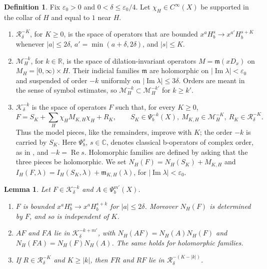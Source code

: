 \documentclass[11pt,oneside,reqno]{article}
\newcommand{\C}{\mathbb C}
\theoremstyle{plain}
\newtheorem{lemma}[theorem]{Lemma}
\theoremstyle{definition}
\newtheorem{definition}[theorem]{Definition}
\theoremstyle{remark}
\begin{document}
\begin{definition}\label{def:K}
Fix \(\varepsilon_0>0\) and \(0<\delta\leq\varepsilon_0/4\). Let
\(\chi_H\in C^\infty(X)\) be supported in the collar of \(H\) and equal to
\(1\) near \(H\).
\begin{enumerate}
\item[(a)] \(\mathcal R^{-K}_\delta\), for \(K\geq0\), is the space of
operators that are bounded \(x^aH^s_b\to x^{a'}H^{s+K}_b\) whenever
\(|a|\leq2\delta\), \(a'=\min(a+\delta,2\delta)\), and \(|s|\leq K\).
\item[(b)] \(\mathcal M^{-k}_H\), for \(k\in\mathbb R\), is the space of
dilation-invariant operators \(M=\mathfrak m(xD_x)\) on
\(M_H=[0,\infty)\times H\). Their indicial families \(\mathfrak m\) are
holomorphic on \(|\operatorname{Im}\lambda|<\varepsilon_0\) and suspended
of order \(-k\) uniformly on \(|\operatorname{Im}\lambda|\leq3\delta\).
Orders are meant in the sense of symbol estimates, so
\(\mathcal M^{-k}_H\subset\mathcal M^{-k'}_H\) for \(k\geq k'\).
\item[(c)] \(\mathcal K^{-k}_\delta\) is the space of operators \(F\) such
that, for every \(K\geq0\),
\[
 F=S_K+\sum_H\chi_HM_{K,H}\chi_H+R_K,\qquad S_K\in\Psi_b^{-k}(X),\
 M_{K,H}\in\mathcal M^{-K}_H,\ R_K\in\mathcal R^{-K}_\delta .
\]
Thus the model pieces, like the remainders, improve with \(K\); the order
\(-k\) is carried by \(S_K\).
Here \(\Psi_b^{s}\), \(s\in\C\), denotes classical b-operators of complex
order, as in \cite{SeeleyCP}, and \(-k=\operatorname{Re}s\). Holomorphic
families are defined by asking that the three pieces be holomorphic. We
set \(N_H(F)=N_H(S_K)+M_{K,H}\) and \(I_H(F,\lambda)=I_H(S_K,\lambda)
+\mathfrak m_{K,H}(\lambda)\), for \(|\operatorname{Im}\lambda|<\varepsilon_0\).
\end{enumerate}
\end{definition}

\begin{lemma}\label{lem:Kclass}
Let \(F\in\mathcal K^{-k}_\delta\) and \(A\in\Psi_b^{m'}(X)\).
\begin{enumerate}
\item[(i)] \(F\) is bounded \(x^aH^s_b\to x^aH^{s+k}_b\) for
\(|a|\leq2\delta\). Moreover \(N_H(F)\) is determined by \(F\), and so is
independent of \(K\).
\item[(ii)] \(AF\) and \(FA\) lie in \(\mathcal K^{-k+m'}_\delta\), with
\(N_H(AF)=N_H(A)N_H(F)\) and \(N_H(FA)=N_H(F)N_H(A)\). The same holds for
holomorphic families.
\item[(iii)] If \(R\in\mathcal R^{-K}_\delta\) and \(K\geq|k|\), then \(FR\)
and \(RF\) lie in \(\mathcal R^{-(K-|k|)}_\delta\).
\end{enumerate}
\end{lemma}
\end{document}
